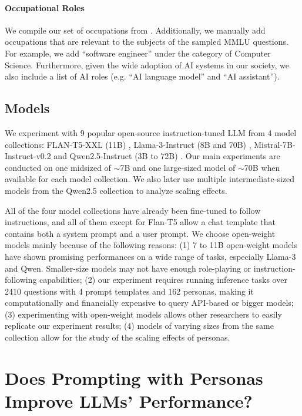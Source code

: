 \documentclass[11pt]{article}
\begin{document}
\paragraph{Occupational Roles}
We compile our set of occupations from \citet{garg2018word}. Additionally, we manually add occupations that are relevant to the subjects of the sampled MMLU questions. For example, we add ``software engineer'' under the category of Computer Science. Furthermore, given the wide adoption of AI systems in our society, we also include a list of AI roles (e.g. ``AI language model'' and ``AI assistant'').

\subsection{Models}

We experiment with 9 popular open-source instruction-tuned LLM from 4 model collections: FLAN-T5-XXL (11B) \cite{flant5}, Llama-3-Instruct (8B and 70B) \cite{llama3modelcard}, Mistral-7B-Instruct-v0.2 \cite{jiang2023mistral} and Qwen2.5-Instruct (3B to 72B) \cite{qwen2.5}. Our main experiments are conducted on one midsized of $\sim$7B and one large-sized model of $\sim$70B when available for each model collection. We also later use multiple intermediate-sized models from the Qwen2.5 collection to analyze scaling effects. 

All of the four model collections have already been fine-tuned to follow instructions, and all of them except for Flan-T5 allow a chat template that contains both a system prompt and a user prompt. We choose open-weight models mainly because of the following reasons: (1) 7 to 11B open-weight models have shown promising performances on a wide range of tasks, especially Llama-3 and Qwen. Smaller-size models may not have enough role-playing or instruction-following capabilities; (2) our experiment requires running inference tasks over 2410 questions with 4 prompt templates and 162 personas, making it computationally and financially expensive to query API-based or bigger models; (3) experimenting with open-weight models allows other researchers to easily replicate our experiment results; (4) models of varying sizes from the same collection allow for the study of the scaling effects of personas. 

\section{Does Prompting with Personas Improve LLMs' Performance?}
\end{document}

